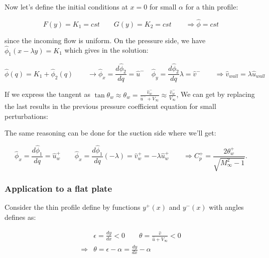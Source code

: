 	Now let's define the initial conditions at $x=0$ for small $\alpha$ for a thin profile:
	
	\begin{equation}
	F(y) = K_1 = cst \qquad G(y) = K_2 = cst \qquad \Rightarrow \hat{\phi} = cst
	\end{equation}
	
	since the incoming flow is uniform. On the pressure side, we have $\hat{\phi} _1(x-\lambda y) = K_1$ which gives in the solution: 
	
	\begin{equation}
	\hat{\phi}(q) = K_1 + \hat{\phi}_2 (q) \qquad \rightarrow \hat{\phi}_x = \frac{d\hat{\phi}_2}{dq} = \hat{u} ^- \quad \hat{\phi}_y = \frac{d\hat{\phi}_2}{dq}\lambda = \hat{v} ^- \qquad \Rightarrow \hat{v}_{wall} = \lambda \hat{u}_{wall}
	\end{equation}
	
	If we express the tangent as $\tan \theta_w \approx \theta_w = \frac{\hat{v}^-_w}{\hat{u}^-+V_\infty} \approx \frac{\hat{v}^-_w}{V_\infty}$,
	We can get by replacing the last results in the previous pressure coefficient equation for small perturbations:
	
		
	\begin{center}
	\end{center}
	
	The same reasoning can be done for the suction side where we'll get:
	
	\begin{equation}
	\hat{\phi} _x = \frac{d\hat{\phi}_1}{dq} = \hat{u}^+_w \qquad \hat{\phi} _x = \frac{d\hat{\phi}_1}{dq}(-\lambda) = \hat{v}^+_w = -\lambda \hat{u}^+_w\qquad \Rightarrow C_p^+ = \frac{2\theta_w^+}{\sqrt{M^2_\infty - 1}}.
	\end{equation}
	
	\subsubsection{Application to a flat plate}
	Consider the thin profile define by functions $y^+(x)$ and $y^-(x)$ with angles defines as:
	
	\begin{equation}
	\begin{aligned}
	&\epsilon = \frac{dy}{dx} <0 \qquad \theta = \frac{\hat{v}}{\hat{u} +V_\infty} <0 \\
	 \Rightarrow &\theta = \epsilon - \alpha = \frac{dy}{dx} - \alpha
	\end{aligned}
	\end{equation}
	
